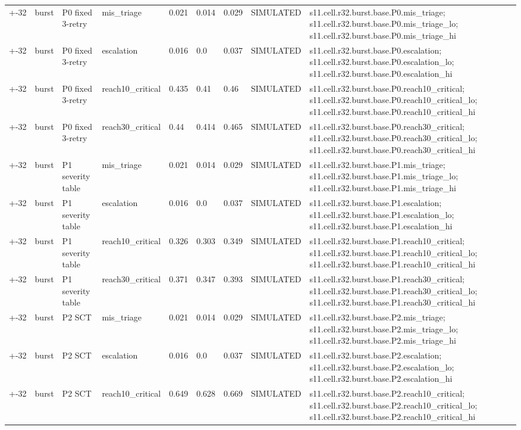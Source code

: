 \begin{table}[t]
\begin{tabular}{lllllllll}
+-32 & burst & P0 fixed 3-retry & mis\_triage & 0.021 & 0.014 & 0.029 & SIMULATED & s11.cell.r32.burst.base.P0.mis\_triage; s11.cell.r32.burst.base.P0.mis\_triage\_lo; s11.cell.r32.burst.base.P0.mis\_triage\_hi \\
+-32 & burst & P0 fixed 3-retry & escalation & 0.016 & 0.0 & 0.037 & SIMULATED & s11.cell.r32.burst.base.P0.escalation; s11.cell.r32.burst.base.P0.escalation\_lo; s11.cell.r32.burst.base.P0.escalation\_hi \\
+-32 & burst & P0 fixed 3-retry & reach10\_critical & 0.435 & 0.41 & 0.46 & SIMULATED & s11.cell.r32.burst.base.P0.reach10\_critical; s11.cell.r32.burst.base.P0.reach10\_critical\_lo; s11.cell.r32.burst.base.P0.reach10\_critical\_hi \\
+-32 & burst & P0 fixed 3-retry & reach30\_critical & 0.44 & 0.414 & 0.465 & SIMULATED & s11.cell.r32.burst.base.P0.reach30\_critical; s11.cell.r32.burst.base.P0.reach30\_critical\_lo; s11.cell.r32.burst.base.P0.reach30\_critical\_hi \\
+-32 & burst & P1 severity table & mis\_triage & 0.021 & 0.014 & 0.029 & SIMULATED & s11.cell.r32.burst.base.P1.mis\_triage; s11.cell.r32.burst.base.P1.mis\_triage\_lo; s11.cell.r32.burst.base.P1.mis\_triage\_hi \\
+-32 & burst & P1 severity table & escalation & 0.016 & 0.0 & 0.037 & SIMULATED & s11.cell.r32.burst.base.P1.escalation; s11.cell.r32.burst.base.P1.escalation\_lo; s11.cell.r32.burst.base.P1.escalation\_hi \\
+-32 & burst & P1 severity table & reach10\_critical & 0.326 & 0.303 & 0.349 & SIMULATED & s11.cell.r32.burst.base.P1.reach10\_critical; s11.cell.r32.burst.base.P1.reach10\_critical\_lo; s11.cell.r32.burst.base.P1.reach10\_critical\_hi \\
+-32 & burst & P1 severity table & reach30\_critical & 0.371 & 0.347 & 0.393 & SIMULATED & s11.cell.r32.burst.base.P1.reach30\_critical; s11.cell.r32.burst.base.P1.reach30\_critical\_lo; s11.cell.r32.burst.base.P1.reach30\_critical\_hi \\
+-32 & burst & P2 SCT & mis\_triage & 0.021 & 0.014 & 0.029 & SIMULATED & s11.cell.r32.burst.base.P2.mis\_triage; s11.cell.r32.burst.base.P2.mis\_triage\_lo; s11.cell.r32.burst.base.P2.mis\_triage\_hi \\
+-32 & burst & P2 SCT & escalation & 0.016 & 0.0 & 0.037 & SIMULATED & s11.cell.r32.burst.base.P2.escalation; s11.cell.r32.burst.base.P2.escalation\_lo; s11.cell.r32.burst.base.P2.escalation\_hi \\
+-32 & burst & P2 SCT & reach10\_critical & 0.649 & 0.628 & 0.669 & SIMULATED & s11.cell.r32.burst.base.P2.reach10\_critical; s11.cell.r32.burst.base.P2.reach10\_critical\_lo; s11.cell.r32.burst.base.P2.reach10\_critical\_hi \\

\end{tabular}
\end{table}
